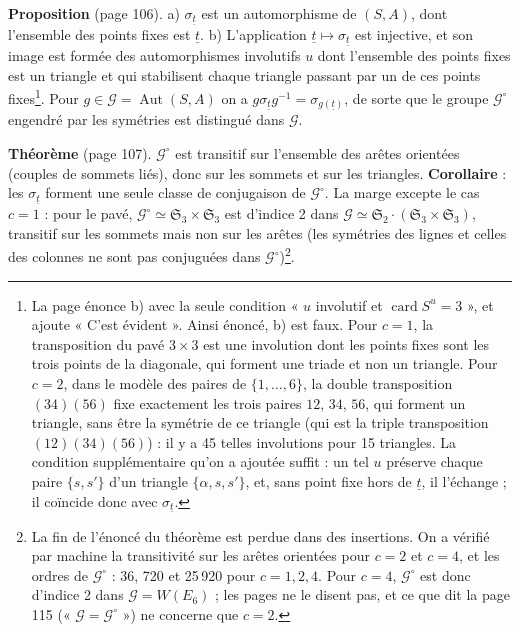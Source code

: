 \documentclass[11pt,a4paper]{article}
\begin{document}
\textbf{Proposition} (page 106). a) $\sigma_{\underline t}$ est un automorphisme
de $(S, A)$, dont l'ensemble des points fixes est $\underline t$. b)
L'application $\underline t \mapsto \sigma_{\underline t}$ est injective, et son
image est formée des automorphismes involutifs $u$ dont l'ensemble des points
fixes est un triangle et qui stabilisent chaque triangle passant par un de ces
points fixes\footnote{La page énonce b) avec la seule condition « $u$ involutif et
$\operatorname{card} S^u = 3$ », et ajoute « C'est évident ». Ainsi énoncé, b) est
faux. Pour $c = 1$, la transposition du pavé $3 \times 3$ est une involution
dont les points fixes sont les trois points de la diagonale, qui forment une
triade et non un triangle. Pour $c = 2$, dans le modèle des paires de $\lbrace
1, \ldots, 6\rbrace$, la double transposition $(34)(56)$ fixe exactement les trois
paires $12$, $34$, $56$, qui forment un triangle, sans être la symétrie de ce
triangle (qui est la triple transposition $(12)(34)(56)$) : il y a 45 telles
involutions pour 15 triangles. La condition supplémentaire qu'on a ajoutée
suffit : un tel $u$ préserve chaque paire $\lbrace s, s'\rbrace$ d'un triangle
$\lbrace \alpha, s, s'\rbrace$, et, sans point fixe hors de $\underline t$, il
l'échange ; il coïncide donc avec $\sigma_{\underline t}$.}. Pour $g \in
\mathcal{G} = \operatorname{Aut}(S, A)$ on a $g \sigma_{\underline t} g^{-1} =
\sigma_{g(\underline t)}$, de sorte que le groupe $\mathcal{G}^\circ$ engendré par
les symétries est distingué dans $\mathcal{G}$.

\textbf{Théorème} (page 107). $\mathcal{G}^\circ$ est transitif sur l'ensemble des
arêtes orientées (couples de sommets liés), donc sur les sommets et sur les
triangles. \textbf{Corollaire} : les $\sigma_{\underline t}$ forment une seule
classe de conjugaison de $\mathcal{G}^\circ$. La marge excepte le cas $c = 1$ :
pour le pavé, $\mathcal{G}^\circ \simeq \mathfrak{S}_3 \times \mathfrak{S}_3$
est d'indice 2 dans $\mathcal{G} \simeq \mathfrak{S}_2 \cdot (\mathfrak{S}_3
\times \mathfrak{S}_3)$, transitif sur les sommets mais non sur les arêtes (les
symétries des lignes et celles des colonnes ne sont pas conjuguées dans
$\mathcal{G}^\circ$)\footnote{La fin de l'énoncé du théorème est perdue dans des
insertions. On a vérifié par machine la transitivité sur les arêtes orientées
pour $c = 2$ et $c = 4$, et les ordres de $\mathcal{G}^\circ$ : 36, 720 et
25\,920 pour $c = 1, 2, 4$. Pour $c = 4$, $\mathcal{G}^\circ$ est donc
d'indice 2 dans $\mathcal{G} = W(E_6)$ ; les pages ne le disent pas, et ce que
dit la page 115 (« $\mathcal{G} = \mathcal{G}^\circ$ ») ne concerne que $c =
2$.}.
\end{document}
